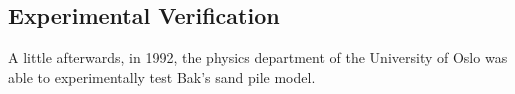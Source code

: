 \documentclass{book}
\begin{document}
\subsection{Experimental Verification}
A little afterwards, in 1992, the physics department of the University of Oslo was able to experimentally test Bak's sand pile model. 
%
%
%
\end{document}
